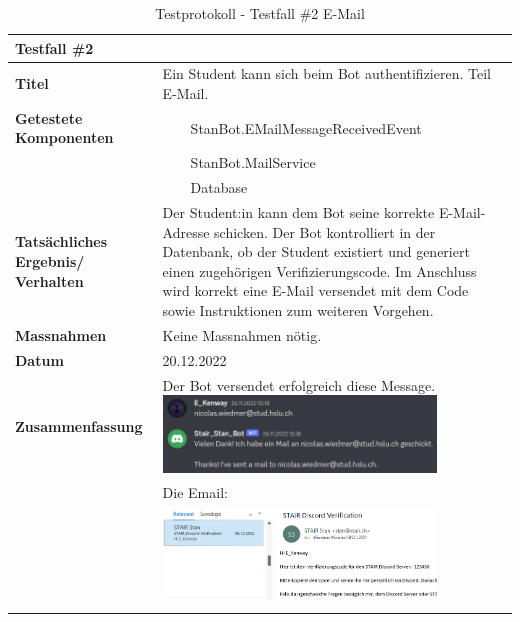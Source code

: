 \documentclass[a4paper, table]{article}
\newcommand{\tabitem}{~~\llap{\textbullet}~~}
\begin{document}
\begin{longtable}[h]{|p{9em}|p{31em}|}
    \hline
    \multicolumn{2}{|l|}{\textbf{Testfall \#2}} \\
    \hline
    \textbf{Titel} & Ein Student kann sich beim Bot authentifizieren. Teil E-Mail. \\
    \hline
    \textbf{Getestete Komponenten} &  
        \tabitem StanBot.EMailMessageReceivedEvent \\*
     &  \tabitem StanBot.MailService \\*
     &  \tabitem Database \\
    \hline
    \textbf{Tatsächliches Ergebnis/ Verhalten} &  
        Der Student:in kann dem Bot seine korrekte E-Mail-Adresse schicken. 
        Der Bot kontrolliert in der Datenbank, ob der Student existiert und generiert einen zugehörigen Verifizierungscode.
        Im Anschluss wird korrekt eine E-Mail versendet mit dem Code sowie Instruktionen zum weiteren Vorgehen. \\
    \hline
    \textbf{Massnahmen} & Keine Massnahmen nötig.\\
    \hline
    \textbf{Datum} & 20.12.2022\\
    \hline
    \textbf{Zusammenfassung} & 
        Der Bot versendet erfolgreich diese Message. 
        \includegraphics[width=0.8\textwidth]{img/Tests/2_Test_emailMessage.png} \\*
     &  Die Email: \\*
     &  \includegraphics[width=0.8\textwidth]{img/Tests/2_Test_email.png} \\
    \hline
    \caption{Testprotokoll - Testfall \#2 E-Mail}
\end{longtable}
\end{document}
